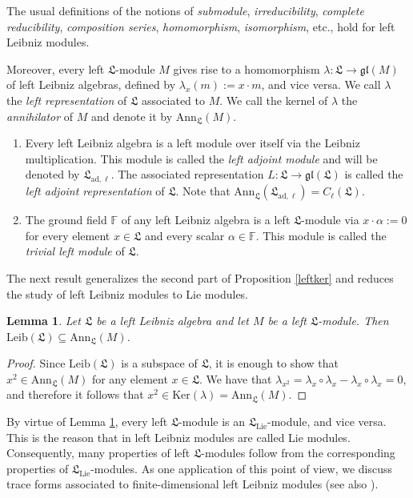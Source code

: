 \documentclass{amsart}
\newtheorem{lem}[thm]{Lemma}
\numberwithin{equation}{section}
\newcommand{\ad}{\mathrm{ad}}
\newcommand{\lie}{\mathrm{Lie}}
\newcommand{\leib}{\mathrm{Leib}}
\newcommand{\Ker}{\mathrm{Ker}}
\newcommand{\ann}{\mathrm{Ann}}
\newcommand{\F}{\mathbb{F}}
\newcommand{\lf}{\mathfrak{L}}
\newcommand{\gl}{\mathfrak{gl}}
\begin{document}
The usual definitions of the notions of {\em submodule\/}, {\em irreducibility\/}, {\em complete
reducibility\/}, {\em composition series\/}, {\em homomorphism\/}, {\em isomorphism\/}, etc.,
hold for left Leibniz modules.

Moreover, every left $\lf$-module $M$ gives rise to a homomorphism $\lambda:\lf\to\gl(M)$ of
left Leibniz algebras, defined by $\lambda_x(m):=x\cdot m$, and vice versa. We call $\lambda$
the {\em left representation\/} of $\lf$ associated to $M$. We call the kernel of $\lambda$ the
{\em annihilator\/} of $M$ and denote it by $\ann_\lf(M)$.
\vspace{.2cm}

\begin{enumerate}
\item[(1)] Every left Leibniz algebra is a left module over itself via the Leibniz multiplication.
                This module is called the {\em left adjoint module\/} and will be denoted by $\lf_{
                \ad,\ell}$. The associated representation $L:\lf\to\gl(\lf)$ is called the {\em left
                adjoint representation\/} of $\lf$. Note that $\ann_\lf(\lf_{\ad,\ell})=C_\ell(\lf)$.
\item[(2)] The ground field $\F$ of any left Leibniz algebra is a left $\lf$-module via $x\cdot
                \alpha:=0$ for every element $x\in\lf$ and every scalar $\alpha\in\F$. This module
                is called the {\em trivial left module\/} of $\lf$.
\end{enumerate}
\vspace{.2cm}

The next result generalizes the second part of Proposition \ref{leftker} and reduces the study
of left Leibniz modules to Lie modules.

\begin{lem}\label{leftann}
Let $\lf$ be a left Leibniz algebra and let $M$ be a left $\lf$-module. Then $\leib(\lf)\subseteq
\ann_\lf(M)$. 
\end{lem}

\begin{proof}
Since $\leib(\lf)$ is a subspace of $\lf$, it is enough to show that $x^2\in\ann_\lf(M)$ for any
element $x\in\lf$. We have that $\lambda_{x^2}=\lambda_x\circ\lambda_x-\lambda_x\circ
\lambda_x=0$, and therefore it follows that $x^2\in\Ker(\lambda)=\ann_\lf(M)$.
\end{proof}

By virtue of Lemma \ref{leftann}, every left $\lf$-module is an $\lf_\lie$-module, and vice
versa. This is the reason that in \cite[D\'efinition 1.1.14]{B} left Leibniz modules are called
Lie modules. Consequently, many properties of left $\lf$-modules follow from the corresponding
properties of $\lf_\lie$-modules. As one application of this point of view, we discuss trace
forms associated to finite-dimensional left Leibniz modules (see also \cite{AAO2,DMS1}).
\end{document}
